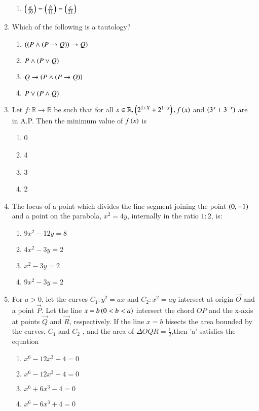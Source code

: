 \documentclass[journal,12pt,onecolumn]{IEEEtran}
\theoremstyle{remark}
\begin{document}
\begin{enumerate}
\begin{enumerate}
\item $\left(\frac{a}{10}\right) = \left(\frac{b}{11}\right) = \left(\frac{c}{21}\right)$
 \end{enumerate}
\item Which of the following is a tautology?
\begin{enumerate}
    \item $\left( \left(P \land \left(P \rightarrow Q\right)\right) \rightarrow Q\right) $
    \item $ P \land \left(P \lor Q\right) $
    \item $ Q \rightarrow \left(P \land \left(P \rightarrow Q\right)\right)$ 
    \item $ P \lor \left(P \land Q\right)$
\end{enumerate}
\item Let $f: \mathbb{R} \rightarrow \mathbb{R}$ be such that for all $ x \in \mathbb{R} , \left(2^{1+X} + 2^{1-x}\right), f\left(x\right)$  and 
$\left(3^x + 3^{-x} \right)$ are in A.P. Then the minimum value of $ f\left(x\right)$ is
\begin{enumerate}
    \item 0
    \item 4
    \item 3
    \item 2
\end{enumerate}
\item The locus of a point which divides the line segment joining the point $\left(0,-1\right)$ and a point on the parabola, $x^2 = 4y$, internally in the ratio $1: 2$, is:
\begin{enumerate}
\item $9x^2 - 12y = 8$
\item $4x^2 - 3y = 2$
\item $x^2 - 3y =2$
\item $9x^2 - 3y = 2$
\end{enumerate}
\item For $a > 0$, let the curves $C_1: y^2 = ax$ and $C_2:x^2=ay$ intersect at origin $\vec{O}$ and a point $\vec{P}$. Let the line $x = b \left(0 < b < a\right)$ intersect the chord $OP$ and the x-axis at points $\vec{Q}$ and $\vec{R}$, respectively. If the line $x = b$ bisects the area bounded by the curves, $C_1$ and $C_2$ , and the area of $\Delta OQR =\frac{1}{2}$,then 'a' satisfies the equation
\begin{enumerate}
    \item $x^6 - 12 x^3 + 4 = 0$
    \item $x^6 - 12 x^3 - 4 = 0$
    \item $x^6 + 6 x^3 - 4 = 0$
    \item $x^6 - 6 x^3 +4 = 0$

\end{enumerate}
\end{enumerate}
\end{document}

